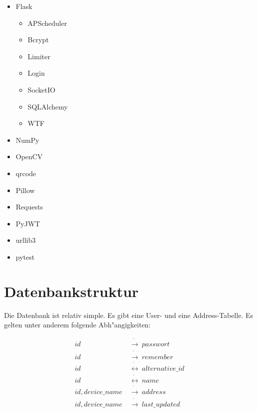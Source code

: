 \begin{samepage}
    \begin{itemize}
        \setlength\itemsep{-0.4em}
        \item Flask
        \begin{itemize}
            \setlength\itemsep{-0.4em}
            \item APScheduler
            \item Bcrypt
            \item Limiter
            \item Login
            \item SocketIO
            \item SQLAlchemy
            \item WTF
        \end{itemize}
        \item NumPy
        \item OpenCV
        \item qrcode
        \item Pillow
        \item Requests
        \item PyJWT
        \item urllib3
        \item pytest
    \end{itemize}
\end{samepage}

\section{Datenbankstruktur}\label{sec:datenbankstruktur}
Die Datenbank ist relativ simple.
Es gibt eine User- und eine Address-Tabelle.
Es gelten unter anderem folgende Abh{"a}ngigkeiten:

\begin{align}
    id ~ &\dot \rightarrow ~ passwort \\
    id ~ &\dot \rightarrow ~ remember \\
    id ~ &\dot \leftrightarrow ~ alternative\_id \\
    id ~ &\dot \leftrightarrow ~ name \\
    id, device\_name ~ &\dot \rightarrow ~ address \\
    id, device\_name ~ &\dot \rightarrow ~ last\_updated
\end{align}


